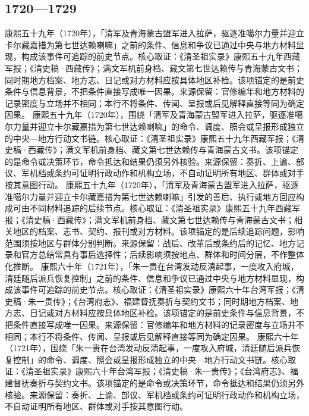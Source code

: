 \subsection{1720—1729}
康熙五十九年（1720年），「清军及青海蒙古盟军进入拉萨，驱逐准噶尔力量并迎立卡尔藏嘉措为第七世达赖喇嘛」之前的条件、信息和争议已通过中央与地方材料显现，构成该事件可追踪的前史节点。核心取证：《清圣祖实录》康熙五十九年西藏军报；《清史稿·西藏传》；满文军机前身档、藏文第七世达赖传与青海蒙古文书；同时期地方档案、地方志、日记或对方材料应按具体地区补检。该项锚定的是前史条件与信息背景，不把条件直接写成唯一因果。来源保留：官修编年和地方材料的记录密度与立场并不相同；本行不将条件、传闻、呈报或后见解释直接等同为确定因果。
康熙五十九年（1720年），围绕「清军及青海蒙古盟军进入拉萨，驱逐准噶尔力量并迎立卡尔藏嘉措为第七世达赖喇嘛」的命令、调度、照会或呈报形成独立的中央—地方行动文书链。核心取证：《清圣祖实录》康熙五十九年西藏军报；《清史稿·西藏传》；满文军机前身档、藏文第七世达赖传与青海蒙古文书。该项锚定的是命令或决策环节，命令抵达和结果仍须另外核验。来源保留：奏折、上谕、部议、军机档或条约可证明行政动作和机构立场，不自动证明所有地区、群体或对手按其意图行动。
康熙五十九年（1720年），「清军及青海蒙古盟军进入拉萨，驱逐准噶尔力量并迎立卡尔藏嘉措为第七世达赖喇嘛」引发的善后、执行或地方回应构成可由不同材料追踪的后续节点。核心取证：《清圣祖实录》康熙五十九年西藏军报；《清史稿·西藏传》；满文军机前身档、藏文第七世达赖传与青海蒙古文书；相关地区的档案、志书、契约、报刊或对方材料。该项锚定的是后续追踪问题，影响范围须按地区与群体分别判断。来源保留：战后、改革后或条约后的记忆、地方记录和官方总结常具有事后选择性；后续影响须按地点、群体和时间分层，不作整体化推断。
康熙六十年（1721年），「朱一贵在台湾发动反清起事，一度攻入府城，清廷随后派兵恢复控制」之前的条件、信息和争议已通过中央与地方材料显现，构成该事件可追踪的前史节点。核心取证：《清圣祖实录》康熙六十年台湾军报；《清史稿·朱一贵传》；《台湾府志》、福建督抚奏折与契约文书；同时期地方档案、地方志、日记或对方材料应按具体地区补检。该项锚定的是前史条件与信息背景，不把条件直接写成唯一因果。来源保留：官修编年和地方材料的记录密度与立场并不相同；本行不将条件、传闻、呈报或后见解释直接等同为确定因果。
康熙六十年（1721年），围绕「朱一贵在台湾发动反清起事，一度攻入府城，清廷随后派兵恢复控制」的命令、调度、照会或呈报形成独立的中央—地方行动文书链。核心取证：《清圣祖实录》康熙六十年台湾军报；《清史稿·朱一贵传》；《台湾府志》、福建督抚奏折与契约文书。该项锚定的是命令或决策环节，命令抵达和结果仍须另外核验。来源保留：奏折、上谕、部议、军机档或条约可证明行政动作和机构立场，不自动证明所有地区、群体或对手按其意图行动。
